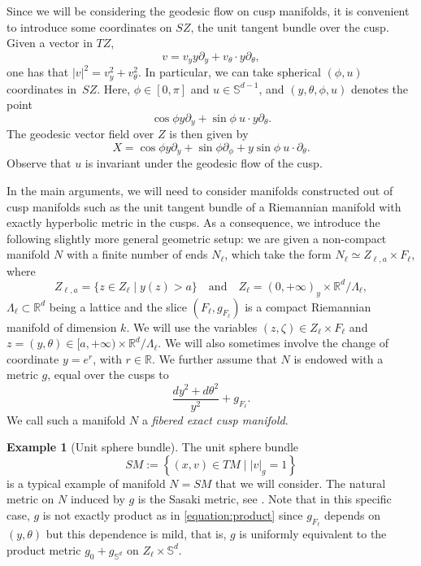 \documentclass[JEP,XML,SOM,Unicode,NoFloatCountersInSection]{cedram}
\newcommand{\quand}{\quad\text{and}\quad}
\newcommand{\R}{\mathbb{R}}
\newcommand{\Ss}{\mathbb{S}}
\theoremstyle{plain}
\theoremstyle{definition}
\newtheorem{example}{Example}[section]
\begin{document}
Since we will be considering the geodesic flow on cusp manifolds, it is convenient to introduce some coordinates on $SZ$, the unit tangent bundle over the cusp. Given a vector in $TZ$,\vspace*{-3pt}
\[
v = v_y y\partial_y + v_\theta\cdot y\partial_\theta,
\]
one has that $|v|^2 = v_y^2 + v_\theta^2$. In particular, we can take spherical $(\phi,u)$ coordinates in~$SZ$. Here, $\phi\in [0,\pi]$ and $u\in \Ss^{d-1}$, and $(y,\theta,\phi,u)$ denotes the point\vspace*{-3pt}
\[
\cos\phi y\partial_y + \sin\phi~ u\cdot y\partial_\theta.
\]
The geodesic vector field over $Z$ is then given by\vspace*{-3pt}
\begin{equation}\label{equation:x}
X = \cos\phi y\partial_y + \sin\phi \partial_\phi + y \sin\phi ~u\cdot \partial_\theta.
\end{equation}
Observe that $u$ is invariant under the geodesic flow of the cusp.

In the main arguments, we will need to consider manifolds constructed out of cusp manifolds such as the unit tangent bundle of a Riemannian manifold with exactly hyperbolic metric in the cusps. As a consequence, we introduce the following slightly more general geometric setup: we are given a non-compact manifold $N$ with a finite number of ends $N_\ell$, which take the form $N_\ell \simeq Z_{\ell,a}\times F_\ell$, where
\[
Z_{\ell,a} = \{ z \in Z_\ell\mid y(z)> a\}\quand Z_\ell =(0,+\infty)_y \times \R^d/\Lambda_\ell,
\]
$\Lambda_\ell \subset \R^d$ being a lattice and the slice $(F_\ell,g_{F_\ell})$ is a compact Riemannian manifold of dimension $k$. We will use the variables $(z,\zeta) \in Z_\ell \times F_\ell$ and $z=(y,\theta) \in [a,+\infty) \times \R^d/\Lambda_\ell$. We will also sometimes involve the change of coordinate $y = e^{r}$, with $r \in \R$. We further assume that $N$ is endowed with a metric $g$, equal over the cusps to
\begin{equation}
\label{equation:product}
\frac{dy^2 + d\theta^2}{y^2} + g_{F_\ell}.
\end{equation}
We call such a manifold $N$ a \emph{fibered exact cusp manifold}.

\begin{example}[Unit sphere bundle]
The unit sphere bundle
\[
SM := \left\{(x,v) \in TM \mid |v|_g=1\right\}
\]
is a typical example of manifold $N=SM$ that we will consider. The natural metric on $N$ induced by $g$ is the Sasaki metric, see \cite[App.\,A.3.2]{Bonthonneau-15}. Note that in this specific case, $g$ is not exactly product as in \eqref{equation:product} since $g_{F_\ell}$ depends on $(y,\theta)$ but this dependence is mild, that is, $g$ is uniformly equivalent to the product metric $g_0 + g_{\Ss^d}$ on $Z_\ell \times \Ss^d$.
\end{example}
\end{document}
